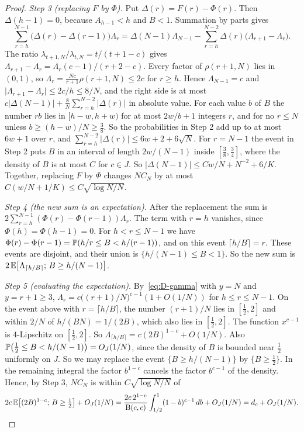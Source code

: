 \begin{proof}
\emph{Step 3 (replacing $F$ by $\Phi$).} Put $\Delta(r)=F(r)-\Phi(r)$. Then
$\Delta(h-1)=0$, because $A_{h-1}<h$ and $B<1$. Summation by parts gives
\[
\sum_{r=h}^{N-1}\bigl(\Delta(r)-\Delta(r-1)\bigr)\Lambda_r
=\Delta(N-1)\Lambda_{N-1}-\sum_{r=h}^{N-2}\Delta(r)\bigl(\Lambda_{r+1}-\Lambda_r\bigr).
\]
The ratio $\lambda_{t+1,N}/\lambda_{t,N}=t/(t+1-c)$ gives
$\Lambda_{r+1}-\Lambda_r=\Lambda_r(c-1)/(r+2-c)$. Every factor of
$\rho(r+1,N)$ lies in $(0,1)$, so $\Lambda_r=\frac{Nc}{r+1}\rho(r+1,N)\le2c$
for $r\ge h$. Hence $\Lambda_{N-1}=c$ and
$\lvert\Lambda_{r+1}-\Lambda_r\rvert\le2c/h\le8/N$, and the right side is at
most $c\lvert\Delta(N-1)\rvert+\frac8N\sum_{r=h}^{N-2}\lvert\Delta(r)\rvert$
in absolute value. For each value $b$ of $B$ the number $rb$ lies in
$[h-w,h+w)$ for at most $2w/b+1$ integers $r$, and for no $r\le N$ unless
$b\ge(h-w)/N\ge\frac38$. So the probabilities in Step 2 add up to at most
$6w+1$ over $r$, and
$\sum_{r=h}^{N-2}\lvert\Delta(r)\rvert\le6w+2+6\sqrt N$. For $r=N-1$ the
event in Step 2 puts $B$ in an interval of length $2w/(N-1)$ inside
$[\frac38,\frac34]$, where the density of $B$ is at most $C$ for $c\in J$. So
$\lvert\Delta(N-1)\rvert\le Cw/N+N^{-2}+6/K$. Together, replacing $F$ by
$\Phi$ changes $NC_N$ by at most $C(w/N+1/K)\le C\sqrt{\log N/N}$.

\emph{Step 4 (the new sum is an expectation).} After the replacement the sum
is $2\sum_{r=h}^{N-1}(\Phi(r)-\Phi(r-1))\Lambda_r$. The term with $r=h$
vanishes, since $\Phi(h)=\Phi(h-1)=0$. For $h<r\le N-1$ we have
$\Phi(r)-\Phi(r-1)=\mathbb{P}(h/r\le B<h/(r-1))$, and on this event
$\lceil h/B\rceil=r$. These events are disjoint, and their union is
$\{h/(N-1)\le B<1\}$. So the new sum is
$2\,\mathbb{E}\bigl[\Lambda_{\lceil h/B\rceil};\,B\ge h/(N-1)\bigr]$.

\emph{Step 5 (evaluating the expectation).} By~\eqref{eq:D-gamma} with $y=N$
and $y=r+1\ge3$,
$\Lambda_r=c\bigl((r+1)/N\bigr)^{c-1}(1+O(1/N))$ for $h\le r\le N-1$. On the
event above with $r=\lceil h/B\rceil$, the number $(r+1)/N$ lies in
$[\frac12,2]$ and within $2/N$ of $h/(BN)=1/(2B)$, which also lies in
$[\frac12,2]$. The function $x^{c-1}$ is $4$-Lipschitz on $[\frac12,2]$. So
$\Lambda_{\lceil h/B\rceil}=c(2B)^{1-c}+O(1/N)$. Also
$\mathbb{P}\bigl(\frac12\le B<h/(N-1)\bigr)=O_J(1/N)$, since the density of $B$ is
bounded near $\frac12$ uniformly on $J$. So we may replace the event
$\{B\ge h/(N-1)\}$ by $\{B\ge\frac12\}$. In the remaining integral the factor
$b^{1-c}$ cancels the factor $b^{c-1}$ of the density. Hence, by Step 3,
$NC_N$ is within $C\sqrt{\log N/N}$ of
\[
2c\,\mathbb{E}\bigl[(2B)^{1-c};\,B\ge\tfrac12\bigr]+O_J(1/N)
=\frac{2c\,2^{1-c}}{\mathrm B(c,c)}\int_{1/2}^1(1-b)^{c-1}\,db+O_J(1/N)=d_c+O_J(1/N).\qedhere
\]
\end{proof}

